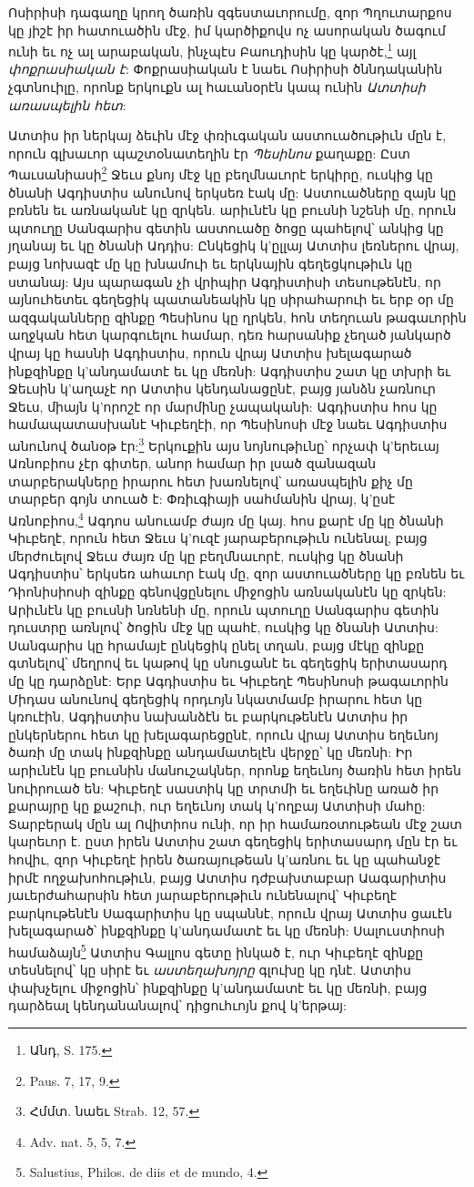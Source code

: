 \documentclass{article}
\begin{document}
{Ոսիրիսի դագաղը կրող ծառին զգեստաւորումը, զոր Պղուտարքոս կը յիշէ իր հատուածին մէջ, իմ կարծիքովս ոչ ասորական ծագում ունի եւ ոչ ալ արաբական, ինչպէս Բաուդիսին կը կարծէ,\footnote{Անդ, S. 175.} այլ \emph{փոքրասիական է}: Փոքրասիական է նաեւ Ոսիրիսի ծննդականին չգտնուիլը, որոնք երկուքն ալ հաւանօրէն կապ ունին \emph{Ատտիսի առասպելին հետ}:

Ատտիս իր ներկայ ձեւին մէջ փռիւգական աստուածութիւն մըն է, որուն գլխաւոր պաշտօնատեղին էր \emph{Պեսինոս} քաղաքը: Ըստ Պաւսանիասի\footnote{Paus. 7, 17, 9.} Ջեւս քնոյ մէջ կը բեղմնաւորէ երկիրը, ուսկից կը ծնանի Ագդիստիս անունով երկսեռ էակ մը: Աստուածները զայն կը բռնեն եւ առնականէ կը զրկեն. արիւնէն կը բուսնի նշենի մը, որուն պտուղը Սանգարիս գետին աստուածը ծոցը պահելով՝ անկից կը յղանայ եւ կը ծնանի Ադդիս: Ընկեցիկ կ'ըլլայ Ատտիս լեռներու վրայ, բայց նոխազէ մը կը խնամուի եւ երկնային գեղեցկութիւն կը ստանայ: Այս պարագան չի վրիպիր Ագդիստիսի տեսութենէն, որ այնուհետեւ գեղեցիկ պատանեակին կը սիրահարուի եւ երբ օր մը ազգականները զինքը Պեսինոս կը ղրկեն, հոն տեղուան թագաւորին աղջկան հետ կարգուելու համար, դեռ հարսանիք չեղած յանկարծ վրայ կը հասնի Ագդիստիս, որուն վրայ Ատտիս խելագարած ինքզինքը կ'անդամատէ եւ կը մեռնի: Ագդիստիս շատ կը տխրի եւ Ջեւսին կ'աղաչէ որ Ատտիս կենդանացընէ, բայց յանձն չառնուր Ջեւս, միայն կ'որոշէ որ մարմինը չապականի: Ագդիստիս հոս կը համապատասխանէ Կիւբեղէի, որ Պեսինոսի մէջ նաեւ Ագդիստիս անունով ծանօթ էր:\footnote{Հմմտ. նաեւ Strab. 12, 57.} Երկուքին այս նոյնութիւնը՝ որչափ կ'երեւայ Առնոբիոս չէր գիտեր, անոր համար իր լսած զանազան տարբերակները իրարու հետ խառնելով՝ առասպելին քիչ մը տարբեր գոյն տուած է: Փռիւգիայի սահմանին վրայ, կ'ըսէ Առնոբիոս,\footnote{Adv. nat. 5, 5, 7.} Ագդոս անուամբ ժայռ մը կայ. հոս քարէ մը կը ծնանի Կիւբեղէ, որուն հետ Ջեւս կ'ուզէ յարաբերութիւն ունենալ, բայց մերժուելով Ջեւս ժայռ մը կը բեղմնաւորէ, ուսկից կը ծնանի Ագդիստիս՝ երկսեռ ահաւոր էակ մը, զոր աստուածները կը բռնեն եւ Դիոնիսիոսի զինքը գենովցընելու միջոցին առնականէն կը զրկեն: Արիւնէն կը բուսնի նռնենի մը, որուն պտուղը Սանգարիս գետին դուստրը առնլով՝ ծոցին մէջ կը պահէ, ուսկից կը ծնանի Ատտիս: Սանգարիս կը հրամայէ ընկեցիկ ընել տղան, բայց մէկը զինքը գտնելով՝ մեղրով եւ կաթով կը սնուցանէ եւ գեղեցիկ երիտասարդ մը կը դարձընէ: Երբ Ագդիստիս եւ Կիւբեղէ Պեսինոսի թագաւորին Միդաս անունով գեղեցիկ որդւոյն նկատմամբ իրարու հետ կը կռուէին, Ագդիստիս նախանձէն եւ բարկութենէն Ատտիս իր ընկերներու հետ կը խելագարեցընէ, որուն վրայ Ատտիս եղեւնոյ ծառի մը տակ ինքզինքը անդամատելէն վերջը՝ կը մեռնի: Իր արիւնէն կը բուսնին մանուշակներ, որոնք եղեւնոյ ծառին հետ իրեն նուիրուած են: Կիւբեղէ սաստիկ կը տրտմի եւ եղեւինը առած իր քարայրը կը քաշուի, ուր եղեւնոյ տակ կ'ողբայ Ատտիսի մահը: Տարբերակ մըն ալ Ովիտիոս ունի, որ իր համառօտութեան մէջ շատ կարեւոր է. ըստ իրեն Ատտիս շատ գեղեցիկ երիտասարդ մըն էր եւ հովիւ, զոր Կիւբեղէ իրեն ծառայութեան կ'առնու եւ կը պահանջէ իրմէ ողջախոհութիւն, բայց Ատտիս դժբախտաբար Աագարիտիս յաւերժահարսին հետ յարաբերութիւն ունենալով՝ Կիւբեղէ բարկութենէն Սագարիտիս կը սպաննէ, որուն վրայ Ատտիս ցաւէն խելագարած՝ ինքզինքը կ'անդամատէ եւ կը մեռնի: Սալուստիոսի համաձայն\footnote{Salustius, Philos. de diis et de mundo, 4.} Ատտիս Գալլոս գետը ինկած է, ուր Կիւբեղէ զինքը տեսնելով՝ կը սիրէ եւ \emph{աստեղախոյրը} գլուխը կը դնէ. Ատտիս փախչելու միջոցին՝ ինքզինքը կ'անդամատէ եւ կը մեռնի, բայց դարձեալ կենդանանալով՝ դիցուհւոյն քով կ'երթայ:

}
\end{document}
